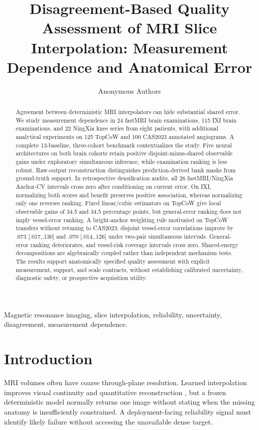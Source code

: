 \documentclass[journal,10pt]{IEEEtran}
\begin{document}
\title{Disagreement-Based Quality Assessment of MRI Slice Interpolation: Measurement Dependence and Anatomical Error}
\author{Anonymous Authors}
\maketitle

\begin{abstract}
Agreement between deterministic MRI interpolators can hide substantial shared error. We study measurement dependence in 24 fastMRI brain examinations, 115 IXI brain examinations, and 22 NingXia knee series from eight patients, with additional analytical experiments on 125 TopCoW and 100 CAS2023 annotated angiograms. A complete 13-baseline, three-cohort benchmark contextualizes the study. Five neural architectures on both brain cohorts retain positive disjoint-minus-shared observable gains under exploratory simultaneous inference, while examination ranking is less robust. Raw-output reconstruction distinguishes prediction-derived bank masks from ground-truth support. In retrospective densification audits, all 26 fastMRI/NingXia Anchor-CV intervals cross zero after conditioning on current error. On IXI, normalizing both scores and benefit preserves positive association, whereas normalizing only one reverses ranking. Fixed linear/cubic estimators on TopCoW give local observable gains of 34.5 and 34.5 percentage points, but general-error ranking does not imply vessel-error ranking. A bright-anchor weighting rule motivated on TopCoW transfers without retuning to CAS2023: disjoint vessel-error correlations improve by .073 [.017,.130] and .070 [.014,.126] under two-pair simultaneous intervals. General-error ranking deteriorates, and vessel-risk coverage intervals cross zero. Shared-energy decompositions are algebraically coupled rather than independent mechanism tests. The results support anatomically specified quality assessment with explicit measurement, support, and scale contracts, without establishing calibrated uncertainty, diagnostic safety, or prospective acquisition utility.
\end{abstract}

\begin{IEEEkeywords}
Magnetic resonance imaging, slice interpolation, reliability, uncertainty, disagreement, measurement dependence.
\end{IEEEkeywords}

\section{Introduction}
 MRI volumes often have coarse through-plane resolution. Learned interpolation improves visual continuity and quantitative reconstruction \cite{peng2020saint,song2024i3net}, but a frozen deterministic model normally returns one image without stating when the missing anatomy is insufficiently constrained. A deployment-facing reliability signal must identify likely failure without accessing the unavailable dense target.
\end{document}

